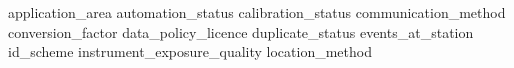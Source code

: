 \documentclass[a4paper]{article}
\begin{document}


\listoftables
\newpage

 {application_area}
 {automation_status}
 {calibration_status}
 {communication_method}
 {conversion_factor}
 {data_policy_licence}
 {duplicate_status}
 {events_at_station}
 {id_scheme}
 {instrument_exposure_quality}
 {location_method}
\end{document}
